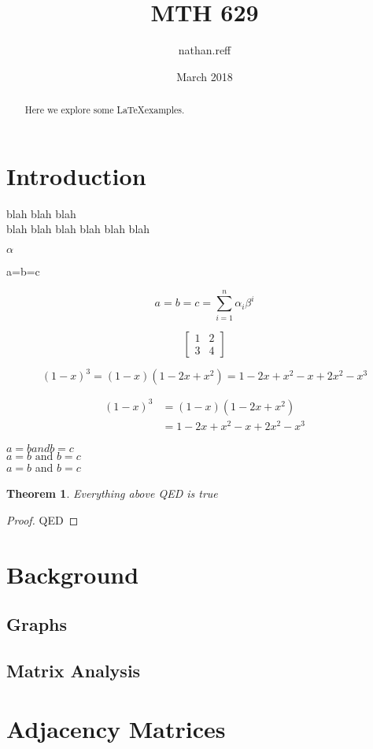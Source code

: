 \documentclass{article}
\title{MTH 629}
\author{nathan.reff }
\date{March 2018}
\newtheorem{theorem}{Theorem}
\begin{document}
\maketitle

\begin{abstract}
Here we explore some \LaTeX examples.
\end{abstract}

\section*{Introduction}

blah blah blah \\
blah blah blah blah blah blah


$\alpha$


a=b=c


\[ a=b=c=\sum_{i=1}^n \alpha_i \beta^i \]


\[
\begin{bmatrix}
1 & 2 \\
3 & 4
\end{bmatrix}
\]


\[ 
(1-x)^3 = (1-x)(1-2x+x^2) = 1-2x+x^2 -x +2x^2 -x^3
\]


\begin{align*}
(1-x)^3 &= (1-x)(1-2x+x^2)\\
        &= 1-2x+x^2 -x +2x^2 -x^3    
\end{align*}

$a=b and b=c$ \\

$a=b\text{ and }b=c$\\


$a=b$ and $b=c$


\begin{theorem}
Everything above QED is true
\end{theorem}
\begin{proof}
QED
\end{proof}


\section*{Background}
\subsection*{Graphs}
\subsection*{Matrix Analysis}

\section*{Adjacency Matrices}
\end{document}
